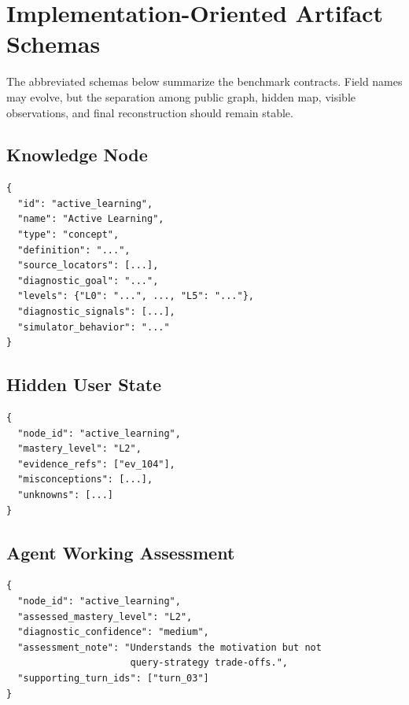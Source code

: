 \section{Implementation-Oriented Artifact Schemas}
\label{app:schemas}

The abbreviated schemas below summarize the benchmark contracts. Field names may evolve, but the separation among public graph, hidden map, visible observations, and final reconstruction should remain stable.

\subsection{Knowledge Node}
\begin{verbatim}
{
  "id": "active_learning",
  "name": "Active Learning",
  "type": "concept",
  "definition": "...",
  "source_locators": [...],
  "diagnostic_goal": "...",
  "levels": {"L0": "...", ..., "L5": "..."},
  "diagnostic_signals": [...],
  "simulator_behavior": "..."
}
\end{verbatim}

\subsection{Hidden User State}
\begin{verbatim}
{
  "node_id": "active_learning",
  "mastery_level": "L2",
  "evidence_refs": ["ev_104"],
  "misconceptions": [...],
  "unknowns": [...]
}
\end{verbatim}

\subsection{Agent Working Assessment}
\begin{verbatim}
{
  "node_id": "active_learning",
  "assessed_mastery_level": "L2",
  "diagnostic_confidence": "medium",
  "assessment_note": "Understands the motivation but not
                      query-strategy trade-offs.",
  "supporting_turn_ids": ["turn_03"]
}
\end{verbatim}
